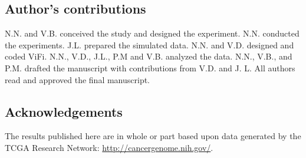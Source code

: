\documentclass{bmcart}
\begin{document}
\begin{backmatter}
\subsection*{Author's contributions}
N.N. and V.B. conceived the study and designed the experiment.  N.N. conducted the experiments.  J.L. prepared the simulated data.  N.N. and V.D. designed and coded ViFi.  N.N., V.D., J.L., P.M and V.B. analyzed the data.  N.N., V.B., and P.M. drafted the manuscript with contributions from V.D. and J. L.  All authors read and approved the final manuscript.

\subsection*{Acknowledgements}
The results published here are in whole or part based upon data generated by the TCGA Research Network: \href{http://cancergenome.nih.gov/}{http://cancergenome.nih.gov/}.





\end{backmatter}
\end{document}
